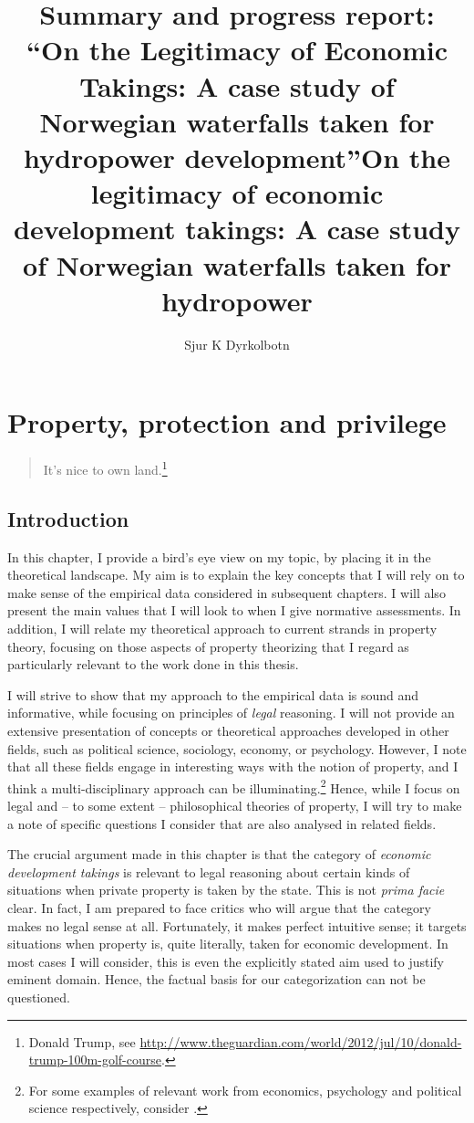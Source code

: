 \documentclass[12pt,a4paper]{book} %
\title{{\huge Summary and progress report:} \\ ``On the Legitimacy of Economic Takings: A case study of Norwegian waterfalls taken for hydropower development''}
\author{Sjur K Dyrkolbotn}
\date{} %
\begin{document}
\title{On the legitimacy of economic development takings: A case study of Norwegian waterfalls taken for hydropower}

\maketitle

\chapter{Property, protection and privilege}\label{chap:1}

\begin{quote}
It's nice to own land.\footnote{Donald Trump,  see \url{http://www.theguardian.com/world/2012/jul/10/donald-trump-100m-golf-course}.}
\end{quote}

\section{Introduction}

In this chapter, I provide a bird's eye view on my topic, by placing it in the theoretical landscape. My aim is to explain the key concepts that I will rely on to make sense of the empirical data considered in subsequent chapters. I will also present the main values that I will look to when I give normative assessments. In addition, I will relate my theoretical approach to current strands in property theory, focusing on those aspects of property theorizing that I regard as particularly relevant to the work done in this thesis.

I will strive to show that my approach to the empirical data is sound and informative, while focusing on principles of {\it legal} reasoning. I will not provide an extensive presentation of concepts or theoretical approaches developed in other fields, such as political science, sociology, economy, or psychology. However, I note that all these fields engage in interesting ways with the notion of property, and I think a multi-disciplinary approach can be illuminating.\footnote{For some examples of relevant work from economics, psychology and political science respectively, consider \cite{miceli11,nadler08,katz97,carruthers04}.} Hence, while I focus on legal and --  to some extent -- philosophical theories of property, I will try to make a note of specific questions I consider that are also analysed in related fields.

The crucial argument made in this chapter is that the category of {\it economic development takings} is relevant to legal reasoning about certain kinds of situations when private property is taken by the state. This is not {\it prima facie} clear. In fact, I am prepared to face critics who will argue that the category makes no legal sense at all. Fortunately, it makes perfect intuitive sense; it targets situations when property is, quite literally, taken for economic development. In most cases I will consider, this is even the explicitly stated aim used to justify eminent domain. Hence, the factual basis for our categorization can not be questioned.
\end{document}

